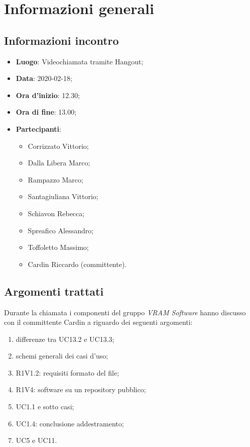 \section{Informazioni generali}
    \subsection{Informazioni incontro}
        \begin{itemize}
 	    \item \textbf{Luogo}: Videochiamata tramite Hangout;
		\item \textbf{Data}: 2020-02-18;
		\item \textbf{Ora d'inizio}: 12.30;
		\item \textbf{Ora di fine}: 13.00;
		\item \textbf{Partecipanti}: 
		\begin{itemize}
			\item Corrizzato Vittorio;
			\item Dalla Libera Marco;
			\item Rampazzo Marco;
			\item Santagiuliana Vittorio;
			\item Schiavon Rebecca;
			\item Spreafico Alessandro;
			\item Toffoletto Massimo;
			\item Cardin Riccardo (committente).
        \end{itemize}
        \end{itemize}
    \subsection{Argomenti trattati}
		Durante la chiamata i componenti del gruppo \textit{VRAM Software} hanno discusso con il committente Cardin a riguardo dei seguenti argomenti:
        \begin{enumerate}
        	\item differenze tra UC13.2 e UC13.3;
        	\item schemi generali dei casi d'uso;
            \item R1V1.2: requisiti formato del file;
            \item R1V4: software su un repository pubblico;
            \item UC1.1 e sotto casi;
            \item UC1.4: conclusione addestramento;
            \item UC5 e UC11.
        \end{enumerate}
